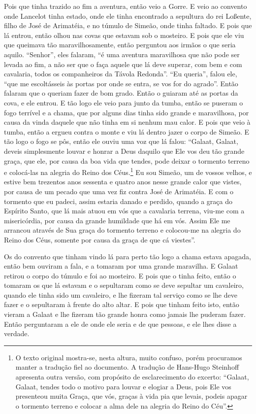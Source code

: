 Pois que tinha trazido ao fim a aventura, então veio a Gorre. E veio ao convento
onde Lancelot tinha estado, onde ele tinha encontrado a sepultura do rei
Loßente, filho de José de Arimatéia, e no túmulo de Simeão, onde tinha faltado.
E pois que lá entrou, então olhou nas covas que estavam sob o mosteiro. E pois
que ele viu que queimava tão maravilhosamente, então perguntou aos irmãos o que
seria aquilo. “Senhor”, eles falaram, “é uma aventura maravilhosa que não pode
ser levada ao fim, a não ser que o faça aquele que lá deve superar, com bem e
com cavalaria, todos os companheiros da Távola Redonda”. “Eu queria”, falou
ele, “que me escoltásseis às portas por onde se entra, se vos for do agrado”.
Então falaram que o queriam fazer de bom grado. Então o guiaram até as portas
da cova, e ele entrou. E tão logo ele veio para junto da tumba, então se
puseram o fogo terrível e a chama, que por alguns dias tinha sido grande e
maravilhosa, por causa da vinda daquele que não tinha em si nenhum mau calor. E
pois que veio à tumba, então a ergueu contra o monte e viu lá dentro jazer o
corpo de Simeão. E tão logo o fogo se pôs, então ele ouviu uma voz que lá
falou: “Galaat, Galaat, deveis simplesmente louvar e honrar a Deus daquilo que
Ele vos deu tão grande graça, que ele, por causa da boa vida que tendes, pode
deixar o tormento terreno e colocá-las na alegria do Reino dos Céus.\footnote{
O texto original mostra-se, nesta altura, muito confuso, porém procuramos
manter a tradução fiel ao documento. A tradução de Hans-Hugo Steinhoff
apresenta outra versão, com propósito de esclarecimento do excerto: “Galaat,
Galaat, tendes todo o motivo para louvar e elogiar a Deus, pois Ele vos
presenteou muita Graça, que vós, graças à vida pia que levais, podeis apagar o
tormento terreno e colocar a alma dele na alegria do Reino do Céu”.} 
Eu sou Simeão, um de vossos velhos, e estive bem trezentos anos sessenta e
quatro anos nesse grande calor que vistes, por causa de um pecado que uma vez
fiz contra José de Arimatéia. E com o tormento que eu padeci, assim estaria
danado e perdido, quando a graça do Espírito Santo, que lá mais atuou em vós
que a cavalaria terrena, viu-me com a misericórdia, por causa da grande
humildade que há em vós. Assim Ele me arrancou através de Sua graça do tormento
terreno e colocou-me na alegria do Reino dos Céus, somente por causa da graça
de que cá viestes”.

Os do convento que tinham vindo lá para perto tão logo a chama estava apagada,
então bem ouviram a fala, e a tomaram por uma grande maravilha. E Galaat
retirou o corpo do túmulo e foi ao mosteiro. E pois que o tinha feito, então o
tomaram os que lá estavam e o sepultaram como se deve sepultar um cavaleiro,
quando ele tinha sido um cavaleiro, e lhe fizeram tal serviço como se lhe deve
fazer e o sepultaram à frente do alto altar. E pois que tinham feito
isto, então vieram a Galaat e lhe fizeram tão grande honra como jamais lhe
puderam fazer. Então perguntaram a ele de onde ele seria e de que
pessoas, e ele lhes disse a verdade.

